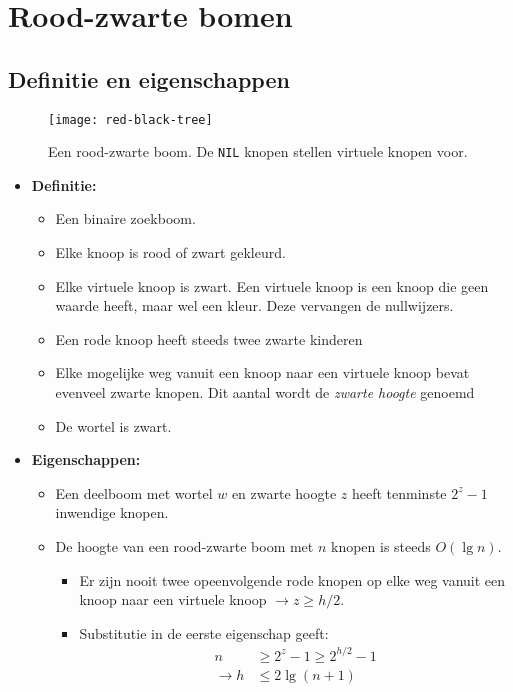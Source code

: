 \section{Rood-zwarte bomen}
\subsection{Definitie en eigenschappen}
\begin{figure}[ht]
    \centering
    \texttt{[image: red-black-tree]}
    \caption{Een rood-zwarte boom. De \texttt{NIL} knopen stellen virtuele knopen voor.}
    \label{fig:red-black-tree}
\end{figure}
\label{sec:rood-zwarte bomen}
\begin{itemize}
    \item \textbf{Definitie:}
    \begin{itemize}
        \item Een binaire zoekboom.
        \item Elke knoop is rood of zwart gekleurd.
        \item Elke virtuele knoop is zwart. Een virtuele knoop is een knoop die geen waarde heeft, maar wel een kleur. Deze vervangen de nullwijzers.
        \item Een rode knoop heeft steeds twee zwarte kinderen
        \item Elke mogelijke weg vanuit een knoop naar een virtuele knoop bevat evenveel zwarte knopen. Dit aantal wordt de \textit{zwarte hoogte} genoemd
        \item De wortel is zwart.
    \end{itemize}
    \item \textbf{Eigenschappen:}
    \begin{itemize}
        \item Een deelboom met wortel $w$ en zwarte hoogte $z$ heeft tenminste $2^z - 1$ inwendige knopen.
        \item De hoogte van een rood-zwarte boom met $n$ knopen is steeds $O(\lg n)$.
        \begin{itemize}
            \item Er zijn nooit twee opeenvolgende rode knopen op elke weg vanuit een knoop naar een virtuele knoop $\rightarrow z \geq h/2$.
            \item Substitutie in de eerste eigenschap geeft:
            \begin{align*}
                n &\geq 2^z - 1 \geq 2^{h/2} - 1 \\
                \rightarrow h & \leq 2\lg(n + 1)
            \end{align*}
        \end{itemize}
    \end{itemize}

\end{itemize}
